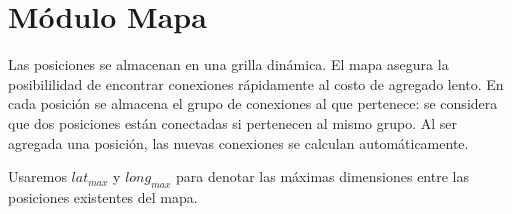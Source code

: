 \newcommand\compmatriz{lat_{max} \times long_{max}}

\section{Módulo Mapa}

Las posiciones se almacenan en una grilla dinámica.
El mapa asegura la posibililidad de encontrar conexiones rápidamente al costo de agregado lento. En cada posición se almacena el grupo de conexiones al que pertenece: se considera que dos posiciones están conectadas si pertenecen al mismo grupo. Al ser agregada una posición, las nuevas conexiones se calculan automáticamente.

Usaremos $lat_{max}$ y $long_{max}$ para denotar las máximas dimensiones entre las posiciones existentes del mapa.

